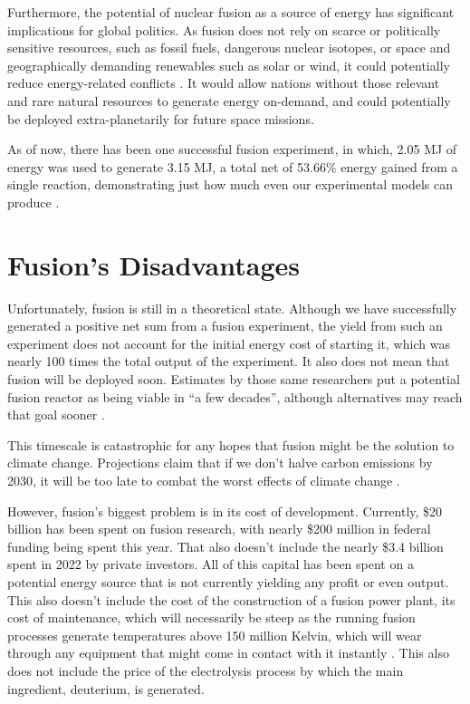 \documentclass[12pt]{article}
\begin{document}
    Furthermore, the potential of nuclear fusion as a source of energy has significant implications for global politics. As fusion does not rely on scarce or politically sensitive resources, such as fossil fuels, dangerous nuclear isotopes, or space and geographically demanding renewables such as solar or wind, it could potentially reduce energy-related conflicts \citep[]{KWES}. It would allow nations without those relevant and rare natural resources to generate energy on-demand, and could potentially be deployed extra-planetarily for future space missions.

    As of now, there has been one successful fusion experiment, in which, 2.05 MJ of energy was used to generate 3.15 MJ, a total net of 53.66\% energy gained from a single reaction, demonstrating just how much even our experimental models can produce \citep{reed_2022}.

    \section{Fusion's Disadvantages}

    Unfortunately, fusion is still in a theoretical state. Although we have successfully generated a positive net sum from a fusion experiment, the yield from such an experiment does not account for the initial energy cost of starting it, which was nearly 100 times the total output of the experiment. It also does not mean that fusion will be deployed soon. Estimates by those same researchers put a potential fusion reactor as being viable in ``a few decades'', although alternatives may reach that goal sooner \citep{reed_2022}. 

    This timescale is catastrophic for any hopes that fusion might be the solution to climate change. Projections claim that if we don't halve carbon emissions by 2030, it will be too late to combat the worst effects of climate change \citep{carrington_2022}. 

    However, fusion's biggest problem is in its cost of development. Currently, \$20 billion has been spent on fusion research, with nearly \$200 million in federal funding being spent this year. That also doesn't include the nearly \$3.4 billion spent in 2022 by private investors. All of this capital has been spent on a potential energy source that is not currently yielding any profit or even output. This also doesn't include the cost of the construction of a fusion power plant, its cost of maintenance, which will necessarily be steep as the running fusion processes generate temperatures above 150 million Kelvin, which will wear through any equipment that might come in contact with it instantly \citep{wurtz_2023}. This also does not include the price of the electrolysis process by which the main ingredient, deuterium, is generated.
\end{document}
